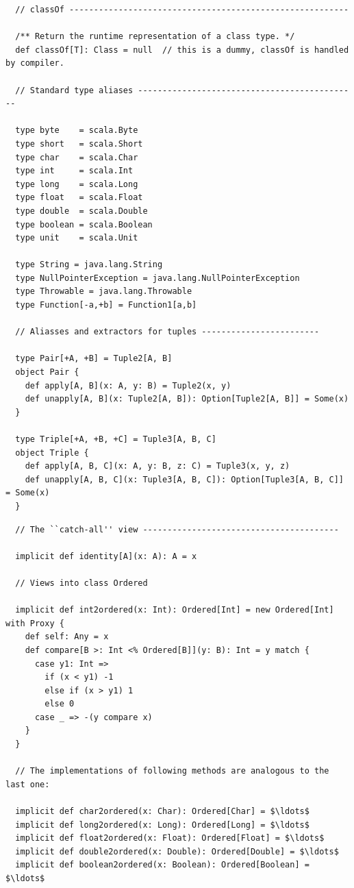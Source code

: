 {\begin{lstlisting}
  // classOf ---------------------------------------------------------

  /** Return the runtime representation of a class type. */
  def classOf[T]: Class = null  // this is a dummy, classOf is handled by compiler.

  // Standard type aliases ---------------------------------------------

  type byte    = scala.Byte
  type short   = scala.Short
  type char    = scala.Char
  type int     = scala.Int
  type long    = scala.Long
  type float   = scala.Float
  type double  = scala.Double
  type boolean = scala.Boolean
  type unit    = scala.Unit

  type String = java.lang.String
  type NullPointerException = java.lang.NullPointerException
  type Throwable = java.lang.Throwable
  type Function[-a,+b] = Function1[a,b]

  // Aliasses and extractors for tuples ------------------------

  type Pair[+A, +B] = Tuple2[A, B]
  object Pair {
    def apply[A, B](x: A, y: B) = Tuple2(x, y)
    def unapply[A, B](x: Tuple2[A, B]): Option[Tuple2[A, B]] = Some(x)
  }

  type Triple[+A, +B, +C] = Tuple3[A, B, C]
  object Triple {
    def apply[A, B, C](x: A, y: B, z: C) = Tuple3(x, y, z)
    def unapply[A, B, C](x: Tuple3[A, B, C]): Option[Tuple3[A, B, C]] = Some(x)
  }
\end{lstlisting}
\newpage
\begin{lstlisting}
  // The ``catch-all'' view ----------------------------------------

  implicit def identity[A](x: A): A = x

  // Views into class Ordered

  implicit def int2ordered(x: Int): Ordered[Int] = new Ordered[Int] with Proxy {
    def self: Any = x
    def compare[B >: Int <% Ordered[B]](y: B): Int = y match {
      case y1: Int =>
        if (x < y1) -1
        else if (x > y1) 1
        else 0
      case _ => -(y compare x)
    }
  }

  // The implementations of following methods are analogous to the last one:

  implicit def char2ordered(x: Char): Ordered[Char] = $\ldots$ 
  implicit def long2ordered(x: Long): Ordered[Long] = $\ldots$ 
  implicit def float2ordered(x: Float): Ordered[Float] = $\ldots$
  implicit def double2ordered(x: Double): Ordered[Double] = $\ldots$
  implicit def boolean2ordered(x: Boolean): Ordered[Boolean] = $\ldots$


\end{lstlisting}}
